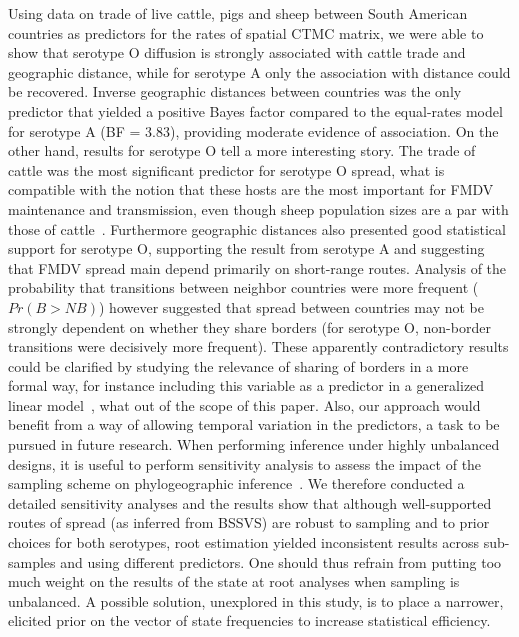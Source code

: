 \documentclass[10pt]{article}
\begin{document}
Using data on trade of live cattle, pigs and sheep between South American countries as predictors for the rates of spatial CTMC matrix, we  were able to show that serotype O diffusion is strongly associated with cattle trade and geographic distance, while for serotype A only the association with distance could be recovered.  
Inverse geographic distances between countries was the only predictor that yielded a positive Bayes factor compared to the equal-rates model for serotype A (BF = $3.83$), providing moderate evidence of association.
On the other hand, results for serotype O tell a more interesting story.
The trade of cattle was the most significant predictor for serotype O spread, what is compatible with the notion that these hosts are the most important for FMDV maintenance and transmission, even though sheep population sizes are a par with those of cattle~\cite{Saraiva2003}.
Furthermore geographic distances also presented good statistical support for serotype O, supporting the result from serotype A and suggesting that FMDV spread main depend primarily on short-range routes.
Analysis of the probability that transitions between neighbor countries were more frequent ($Pr(B>NB)$) however suggested that spread between countries may not be strongly dependent on whether they share borders (for serotype O, non-border transitions were decisively more frequent).  
These apparently contradictory results could be clarified by studying the relevance of sharing of borders in a more formal way, for instance including this variable as a predictor in a generalized linear model~\cite{Lemey2014}, what out of the scope of this paper.
Also, our approach would benefit from a way of allowing temporal variation in the predictors, a task to be pursued in future research. 
% 
When performing inference under highly unbalanced designs, it is useful to perform sensitivity analysis to assess the impact of the sampling scheme on phylogeographic inference~\cite{Faria2012, polar, fluPNAS}. 
We therefore conducted a detailed sensitivity analyses and the results show that although well-supported routes of spread (as inferred from BSSVS) are robust to sampling and to prior choices for both serotypes, root estimation yielded inconsistent results across sub-samples and using different predictors.
One should thus refrain from putting too much weight on the results of the state at root analyses when sampling is unbalanced.
A possible solution, unexplored in this study, is to place a narrower, elicited prior on the vector of state frequencies to increase statistical efficiency.
\end{document}
